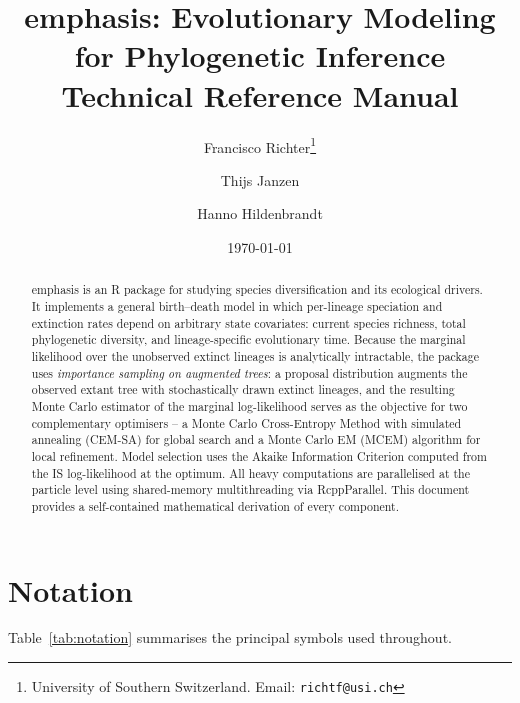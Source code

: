 \documentclass[12pt,a4paper]{article}
\title{%
  \textbf{\textsf{emphasis}}: Evolutionary Modeling for Phylogenetic
  Inference\\[0.4em]
  \large Technical Reference Manual}
\author{Francisco Richter\thanks{University of Southern Switzerland.
  Email: \texttt{richtf@usi.ch}}
  \and Thijs Janzen
  \and Hanno Hildenbrandt}
\date{\today}
\begin{document}
\maketitle
\tableofcontents
\bigskip
\onehalfspacing

\begin{abstract}
\noindent
\textsf{emphasis} is an \textsf{R} package for studying species diversification
and its ecological drivers. It implements a general birth--death model in which
per-lineage speciation and extinction rates depend on arbitrary state covariates:
current species richness, total phylogenetic diversity, and lineage-specific
evolutionary time. Because the marginal likelihood over the unobserved extinct
lineages is analytically intractable, the package uses \emph{importance sampling
on augmented trees}: a proposal distribution augments the observed extant tree
with stochastically drawn extinct lineages, and the resulting Monte Carlo
estimator of the marginal log-likelihood serves as the objective for two
complementary optimisers -- a Monte Carlo Cross-Entropy Method with simulated
annealing (CEM-SA) for global search and a Monte Carlo EM (MCEM) algorithm
for local refinement. Model selection uses the Akaike Information Criterion
computed from the IS log-likelihood at the optimum. All heavy computations are
parallelised at the particle level using shared-memory multithreading via
\textsf{RcppParallel}.
This document provides a self-contained mathematical derivation of every
component.
\end{abstract}

\section{Notation}\label{sec:notation}

Table~\ref{tab:notation} summarises the principal symbols used throughout.
\end{document}
